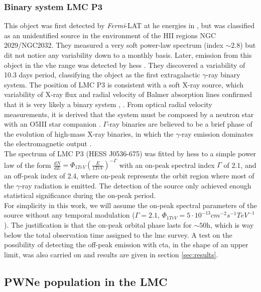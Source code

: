 \documentclass[main.tex]{subfiles}
\begin{document}
\subsubsection{Binary system LMC P3}

This object was first detected by \textit{Fermi}-LAT at \gls{he} energies in \cite{2016LMCFermiLAT}, but was classified as an unidentified source in the environment of the HII regions NGC 2029/NGC2032. They measured a very soft power-law spectrum (index $\sim 2.8$) but dit not notice any variability down to a monthly basis.
Later, emission from this object in the \gls{vhe} range was detected by \gls{hess} \cite{2017HESSLMCP3}. They discovered a variability of 10.3 days period, classifying the object as the first extragalactic $\gamma$-ray binary system. The position of LMC P3 is consistent with a soft X-ray source, which variability of X-ray flux and radial velocity of Balmer absorption lines confirmed that it is very likely a binary system \cite{1981softXraysLMC}, \cite{2012xraybinaryP3}. From optical radial velocity measurements, it is derived that the system must be composed by a neutron star with an O5III star companion \cite{2016P3binary}. $\Gamma$-ray binaries are believed to be a brief phase of the evolution of high-mass X-ray binaries, in which the $\gamma$-ray emission dominates the electromagnetic output \cite{1989binaries}.\\
The spectrum of LMC P3 (HESS J0536-675) was fitted by \gls{hess} to a simple power law of the form $\frac{dN}{dE} = \Phi_{1TeV}\left( \frac{E}{1TeV}\right)^{-\Gamma}$ with an on-peak spectral index $\Gamma$ of 2.1, and an off-peak index of 2.4, where on-peak represents the orbit region where most of the $\gamma$-ray radiation is emitted. The detection of the source only achieved enough statistical significance during the on-peak period.\\
For simplicity in this work, we will assume the on-peak spectral parameters of the source without any temporal modulation ($\Gamma=2.1$, $\Phi_{1TeV} = 5 \cdot 10^{-13}cm^{-2}s^{-1}TeV^{-1}$). The justification is that the on-peak orbital phase lasts for $\sim 50$h, which is way below the total observation time assigned to the \gls{lmc} survey. A test on the possibility of detecting the off-peak emission with \gls{cta}, in the shape of an upper limit, was also carried on and results are given in section \ref{sec:results}.

\subsection{PWNe population in the LMC}\label{sec:pwnepop}
\end{document}
